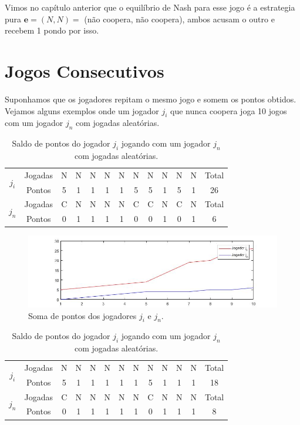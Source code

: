 Vimos no capítulo anterior que o equilíbrio de Nash para esse jogo é a estrategia pura $\textbf{e}=(N,N)=$ (não coopera, não coopera), ambos acusam o outro e recebem 1 pondo por isso. 

\section{Jogos Consecutivos}

Suponhamos que os jogadores repitam o mesmo jogo e somem os pontos obtidos. Vejamos alguns exemplos onde um jogador $j_i$ que nunca coopera joga 10 jogos com um jogador $j_n$ com jogadas aleatórias.

\begin{table}[H]
\centering
\begin{tabular}{|c|c|c|c|c|c|c|c|c|c|c|c|c|}\hline
\multirow{2}{*}{$j_i$} & Jogadas & N & N & N & N & N & N & N & N &	N &	N & Total\\\cline{2-12}
 & Pontos & 5 & 1 & 1 & 1 & 1 & 5 & 5 & 1 & 5 & 1 & 26\\\hline\hline
\multirow{2}{*}{$j_n$} & Jogadas & C & N & N & N & N & C & C & N &	C &	N & Total\\\cline{2-12}
 & Pontos & 0 & 1 & 1 & 1 & 1 & 0 & 0 & 1 & 0 & 1 & 6\\\hline
\end{tabular}
\caption{Saldo de pontos do jogador $j_i$ jogando com um jogador $j_n$ com jogadas aleatórias.}
\label{tab1}
\end{table}

\begin{figure}[H]
\centering
\includegraphics[width=14cm]{graf1.jpg}
\caption{Soma de pontos dos jogadores $j_i$ e $j_n$.}
\label{fig1}
\end{figure}

\begin{table}[H]
\centering
\begin{tabular}{|c|c|c|c|c|c|c|c|c|c|c|c|c|}\hline
\multirow{2}{*}{$j_i$} & Jogadas & N & N & N & N & N & N & N & N &	N &	N & Total\\\cline{2-12}
 & Pontos & 5 & 1 & 1 & 1 & 1 & 1 & 5 & 1 & 1 & 1 & 18\\\hline\hline
\multirow{2}{*}{$j_n$} & Jogadas & C & N & N & N & N & N & C & N &	N &	N & Total\\\cline{2-12}
 & Pontos & 0 & 1 & 1 & 1 & 1 & 1 & 0 & 1 & 1 & 1 & 8\\\hline
\end{tabular}
\caption{Saldo de pontos do jogador $j_i$ jogando com um jogador $j_n$ com jogadas aleatórias.}
\label{tab2}
\end{table}

